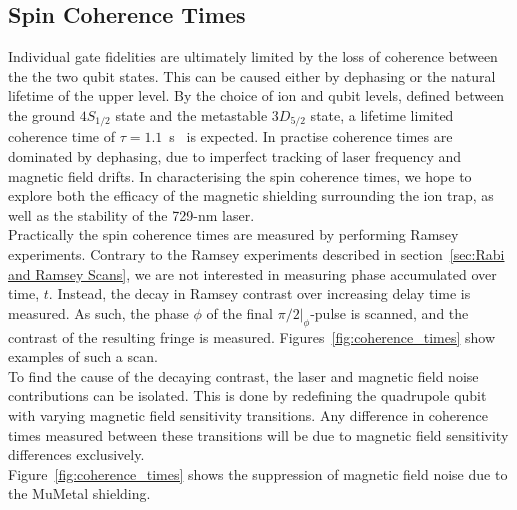

\subsection{Spin Coherence Times}
\label{sec:Coherence}

    Individual gate fidelities are ultimately limited by the loss of coherence
    between the the two qubit states. This can be caused either by dephasing or
    the natural lifetime of the upper level. By the choice of ion and qubit
    levels, defined between the ground $4S_{1/2}$ state and the metastable
    $3D_{5/2}$ state, a lifetime limited coherence time of $\tau =
    1.1$~s~\cite{barton_measurement_2000} is expected. 
    In practise coherence times are dominated by dephasing, due to imperfect
    tracking of laser frequency and magnetic field drifts.  In characterising
    the spin coherence times, we hope to explore both the efficacy of the
    magnetic shielding surrounding the ion trap, as well as the stability of the
    729-nm laser. \\
    Practically the spin coherence times are measured by performing Ramsey experiments.
    Contrary to the Ramsey experiments described in section~\ref{sec:Rabi and Ramsey
    Scans}, we are not interested in measuring phase accumulated over time, $t$.
    Instead, the decay in Ramsey contrast over increasing delay time is measured. As such, the phase $\phi$ of the final
    $\pi/2|_\phi$-pulse is scanned, and the contrast of the resulting fringe is measured.
    Figures~\ref{fig:coherence_times} show examples of such a scan. \\
    To find the cause of the decaying contrast, the laser and
    magnetic field noise contributions can be isolated. This is done by redefining the quadrupole qubit with
    varying magnetic field sensitivity transitions. Any difference in coherence
    times measured between these transitions will be due to magnetic field
    sensitivity differences exclusively. \\
    Figure~\ref{fig:coherence_times} shows the suppression of magnetic field noise due to the MuMetal shielding. \\


